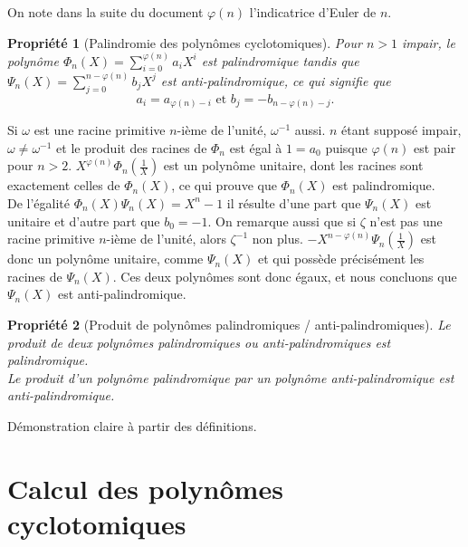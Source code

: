 \documentclass{article}
\theoremstyle{break}                  %
\newtheorem{propriete}{Propriété}
\begin{document}
On note dans la suite du document $\varphi(n)$ l'indicatrice d'Euler de $n$.

\begin{propriete}[Palindromie des polynômes cyclotomiques]
	Pour $n > 1$ impair, le polynôme $\Phi_n(X) = \sum_{i=0}^{\varphi(n)} a_i X^i$ est palindromique tandis que $\Psi_n(X) = \sum_{j=0}^{n-\varphi(n)} b_j X^j$ est anti-palindromique, ce qui signifie que
	$$a_i=a_{\varphi(n)-i} \text{ et } b_j=-b_{n-\varphi(n)-j}.$$
\end{propriete}
Si $\omega$ est une racine primitive $n$-ième de l'unité, $\omega^{-1}$ aussi. $n$ étant supposé impair, $\omega \neq \omega^{-1}$ et le produit des racines de $\Phi_{n}$ est égal à $1 = a_0$ puisque $\varphi(n)$ est pair pour $n > 2$. $X^{\varphi(n)} \Phi_n(\frac{1}{X})$ est un polynôme unitaire, dont les racines sont exactement celles de $\Phi_n(X)$, ce qui prouve que $\Phi_n(X)$ est palindromique.\\

De l'égalité $\Phi_n(X)\Psi_n(X) = X^n-1$ il résulte d'une part que $\Psi_n(X)$ est unitaire et d'autre part que $b_0=-1$. On remarque aussi que si $\zeta$ n'est pas une racine primitive $n$-ième de l'unité, alors $\zeta^{-1}$ non plus. $-X^{n-\varphi(n)} \Psi_n(\frac{1}{X})$ est donc un polynôme unitaire, comme $\Psi_{n}(X)$ et qui possède précisément les racines de $\Psi_{n}(X)$. Ces deux polynômes sont donc égaux, et nous concluons que $\Psi_{n}(X)$ est anti-palindromique.


\begin{propriete}[Produit de polynômes palindromiques / anti-palindromiques]
	Le produit de deux polynômes palindromiques ou anti-palindromiques est palindromique.\\
	Le produit d'un polynôme palindromique par un polynôme anti-palindromique est anti-palindromique.
\end{propriete}
Démonstration claire à partir des définitions. 

\section*{Calcul des polynômes cyclotomiques}
\end{document}
